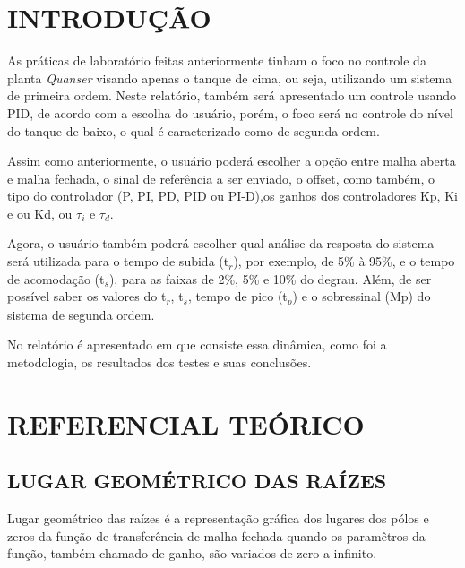 \documentclass[a4paper,12pt]{article}
\begin{document}

\thispagestyle{main}

\section{INTRODUÇÃO}

\begin{flushleft}
\hspace{4ex}As práticas de laboratório feitas anteriormente tinham o foco no controle da planta \textit{Quanser} visando apenas o tanque de cima, ou seja, utilizando um sistema de primeira ordem. Neste relatório, também será apresentado um controle usando PID, de acordo com a escolha do usuário, porém, o foco será no controle do nível do tanque de baixo, o qual é caracterizado como de segunda ordem.

\hspace{4ex}Assim como anteriormente, o usuário poderá escolher a opção entre malha aberta e malha fechada, o sinal de referência a ser enviado, o offset, como também, o tipo do controlador (P, PI, PD, PID ou PI-D),os ganhos dos controladores Kp, Ki e ou Kd, ou $\tau_i$ e $\tau_d.$ 

\hspace{4ex}Agora, o usuário também poderá escolher qual análise da resposta do sistema será utilizada para o tempo de subida (t$_r$), por exemplo, de 5\% à 95\%, e o tempo de acomodação (t$_s$), para as faixas de 2\%, 5\% e 10\% do degrau. Além, de ser possível saber os valores do t$_r$, t$_s$, tempo de pico (t$_p$) e o sobressinal (Mp) do sistema de segunda ordem.

\hspace{4ex}No relatório é apresentado em que consiste essa dinâmica, como foi a metodologia, os resultados dos testes e suas conclusões.
\end{flushleft}

\newpage


\thispagestyle{main}

\section{REFERENCIAL TEÓRICO}

\subsection{LUGAR GEOMÉTRICO DAS RAÍZES}
\hspace{4ex}Lugar geométrico das raízes é a representação gráfica dos lugares dos pólos e zeros da função de transferência de malha fechada quando os paramêtros da função, também chamado de ganho, são variados de zero a infinito.
 
\end{document}
